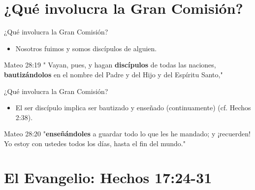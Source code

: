\documentclass[17pt, aspectratio=169]{beamer}
\begin{document}


\section{¿Qué involucra la Gran Comisi\'on?}

\begin{frame}{¿Qué involucra la Gran Comisi\'on?}
    \begin{itemize}
        \item Nosotros fuimos y somos discípulos de alguien.
    \end{itemize}
    
    \begin{citaBiblicaSlide}{Mateo 28:19}
        " Vayan, pues, y hagan \textbf{discípulos} de todas las naciones, \textbf{bautizándolos} en el nombre del Padre y del Hijo y del Espíritu Santo,"
    \end{citaBiblicaSlide}
\end{frame}

\begin{frame}{¿Qué involucra la Gran Comisi\'on?}
    \begin{itemize}
        \item El ser disc\'ipulo implica ser bautizado y enseñado (continuamente) (cf. Hechos 2:38).
    \end{itemize}
    
    \begin{citaBiblicaSlide}{Mateo 28:20}
        "\textbf{enseñándoles} a guardar todo lo que les he mandado; y ¡recuerden! Yo estoy con ustedes todos los días, hasta el fin del mundo."
    \end{citaBiblicaSlide}
\end{frame}

\section{El Evangelio: Hechos 17:24-31}

\end{document}
